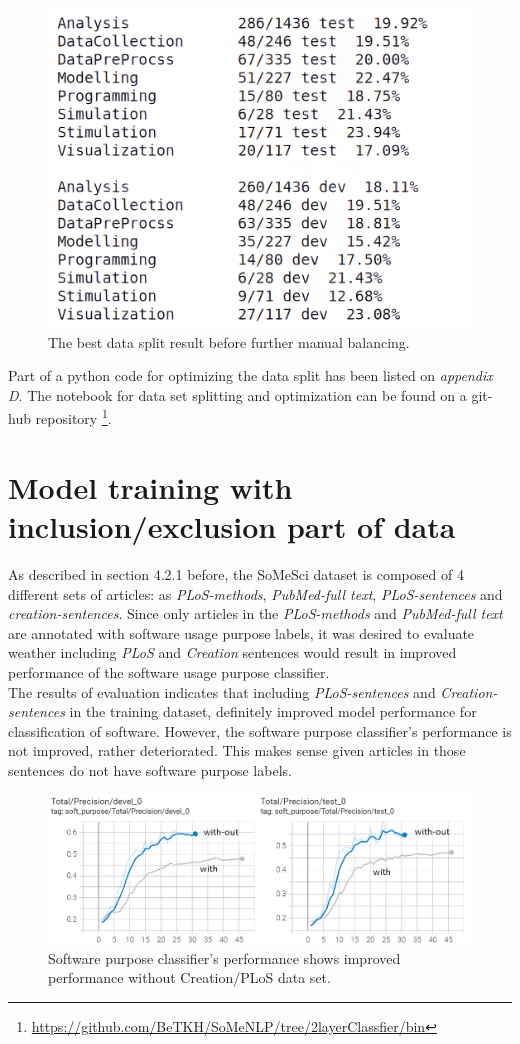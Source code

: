 \begin{figure}[htbp]
	\centering
	\includegraphics[width=.55\textwidth]{4.graphics/figures/ch_6/optimal_split_sofar}
	\caption{The best data split result before further manual balancing.}
	\label{fig:chapter04:setup}
\end{figure}

Part of a python code for optimizing the data split has been listed on \emph{appendix D}. The notebook for data set splitting and optimization can be found on a git-hub repository  \footnote{\url{https://github.com/BeTKH/SoMeNLP/tree/2layerClassfier/bin}}. 

\section{Model training with inclusion/exclusion part of data}
\label{sec:chapter06:exclusion}

As described in section 4.2.1 before, the SoMeSci dataset is composed of 4 different sets of articles: as \emph{PLoS-methods}, \emph{PubMed-full text}, \emph{ PLoS-sentences} and \emph{creation-sentences}. Since only articles in the  \emph{PLoS-methods} and \emph{PubMed-full text} are annotated with software usage purpose labels, it was desired to evaluate weather including \emph{PLoS} and \emph{Creation} sentences would result in improved performance of the software usage purpose classifier.   \\

The results of evaluation indicates that including \emph{PLoS-sentences} and \emph{Creation-sentences} in the training dataset, definitely improved model performance for classification of software. However, the software purpose classifier’s performance is not improved, rather deteriorated. This makes sense given articles in those sentences do not have software purpose labels. \\

\begin{figure}[htbp]
	\centering
	\includegraphics[width=.90\textwidth]{4.graphics/figures/ch_6/1.with_sent_vs_without/HD/1}
	\caption{Software purpose classifier's performance shows improved performance without Creation/PLoS data set.}
	\label{fig:chapter06:without}
\end{figure}


